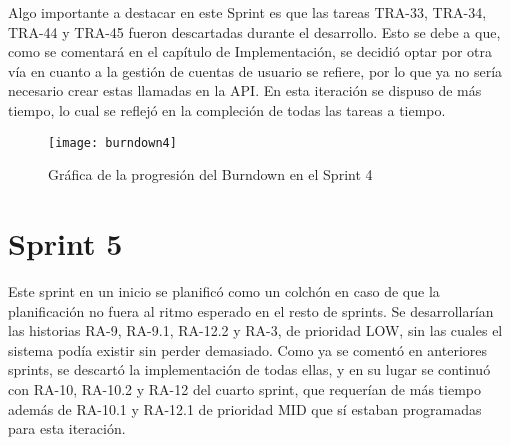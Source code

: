 Algo importante a destacar en este Sprint es que las tareas TRA-33, TRA-34, TRA-44 y TRA-45 fueron descartadas durante el desarrollo. Esto se debe a que, como se comentará en el capítulo de Implementación, se decidió optar por otra vía en cuanto a la gestión de cuentas de usuario se refiere, por lo que ya no sería necesario crear estas llamadas en la API. En esta iteración se dispuso de más tiempo, lo cual se reflejó en la compleción de todas las tareas a tiempo.

\begin{figure}[h]
    \centering
    \texttt{[image: burndown4]}
    \caption[Burndown Sprint 4]{Gráfica de la progresión del Burndown en el Sprint 4}
\end{figure}

\section{Sprint 5}

Este sprint en un inicio se planificó como un colchón en caso de que la planificación no fuera al ritmo esperado en el resto de sprints. Se desarrollarían las historias RA-9, RA-9.1, RA-12.2 y RA-3, de prioridad LOW, sin las cuales el sistema podía existir sin perder demasiado. Como ya se comentó en anteriores sprints, se descartó la implementación de todas ellas, y en su lugar se continuó con RA-10, RA-10.2 y RA-12 del cuarto sprint, que requerían de más tiempo además de RA-10.1 y RA-12.1 de prioridad MID que sí estaban programadas para esta iteración.

\begin{table}[H]
\label{TRA-47}
\end{table}

\begin{table}[H]
\label{TRA-48}
\end{table}

